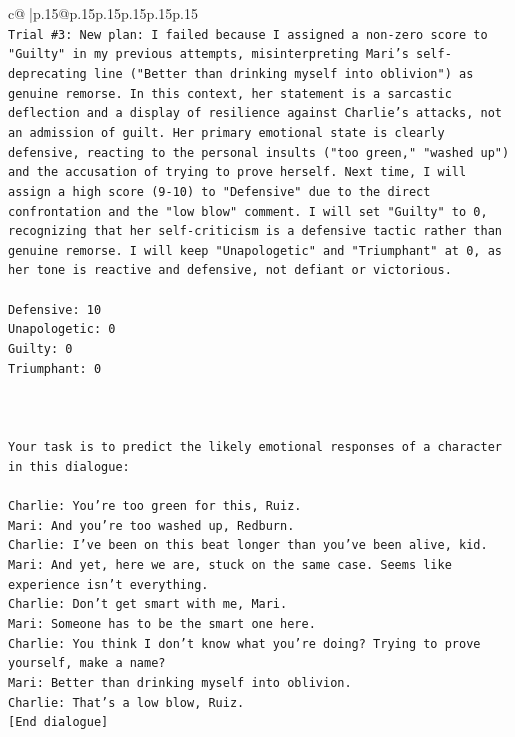 \documentclass{article}
\begin{document}
{\begin{supertabular}{c@{$\;$}|p{.15\linewidth}@{}p{.15\linewidth}p{.15\linewidth}p{.15\linewidth}p{.15\linewidth}p{.15\linewidth}}
{{{\\ 
\texttt{Trial \#3: New plan: I failed because I assigned a non{-}zero score to "Guilty" in my previous attempts, misinterpreting Mari's self{-}deprecating line ("Better than drinking myself into oblivion") as genuine remorse. In this context, her statement is a sarcastic deflection and a display of resilience against Charlie's attacks, not an admission of guilt. Her primary emotional state is clearly defensive, reacting to the personal insults ("too green," "washed up") and the accusation of trying to prove herself. Next time, I will assign a high score (9{-}10) to "Defensive" due to the direct confrontation and the "low blow" comment. I will set "Guilty" to 0, recognizing that her self{-}criticism is a defensive tactic rather than genuine remorse. I will keep "Unapologetic" and "Triumphant" at 0, as her tone is reactive and defensive, not defiant or victorious.} \\
\\ 
\texttt{Defensive: 10} \\
\texttt{Unapologetic: 0} \\
\texttt{Guilty: 0} \\
\texttt{Triumphant: 0} \\
\\ 
\\ 
\\ 
\texttt{Your task is to predict the likely emotional responses of a character in this dialogue:} \\
\\ 
\texttt{Charlie: You're too green for this, Ruiz.} \\
\texttt{Mari: And you're too washed up, Redburn.} \\
\texttt{Charlie: I've been on this beat longer than you've been alive, kid.} \\
\texttt{Mari: And yet, here we are, stuck on the same case. Seems like experience isn't everything.} \\
\texttt{Charlie: Don't get smart with me, Mari.} \\
\texttt{Mari: Someone has to be the smart one here.} \\
\texttt{Charlie: You think I don't know what you're doing? Trying to prove yourself, make a name?} \\
\texttt{Mari: Better than drinking myself into oblivion.} \\
\texttt{Charlie: That's a low blow, Ruiz.} \\
\texttt{{[}End dialogue{]}} \\
}}}
\end{supertabular}}
\end{document}
